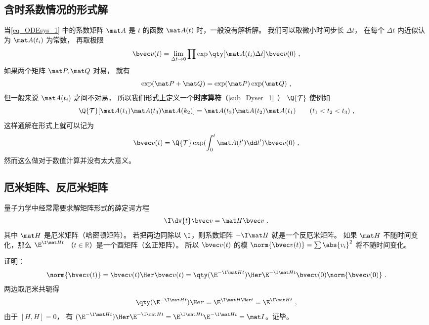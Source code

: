 \subsection{含时系数情况的形式解}
当\autoref{eq_ODEsys_1} 中的系数矩阵 $\mat A$ 是 $t$ 的函数 $\mat A(t)$ 时，一般没有解析解。 我们可以取微小时间步长 $\Delta t$， 在每个 $\Delta t$ 内近似认为 $\mat A(t_i)$ 为常数， 再取极限
\begin{equation}
\bvec v(t) = \lim_{\Delta t \to 0} \prod \exp\qty[\mat A(t_i)\Delta t] \bvec v(0)~,
\end{equation}
如果两个矩阵 $\mat P, \mat Q$ 对易， 就有
\begin{equation}
\exp(\mat P + \mat Q) = \exp(\mat P)\exp(\mat Q)~,
\end{equation}
但一般来说 $\mat A(t_i)$ 之间不对易， 所以我们形式上定义一个\textbf{时序算符}（\autoref{sub_Dyser_1}~） $\Q{\mathcal T}$ 使例如
\begin{equation}
\Q {\mathcal T} [\mat A(t_1) \mat A(t_3) \mat A(k_2)] = \mat A(t_3) \mat A(t_2) \mat A(t_1) \qquad ( t_1 < t_2 < t_3 )~,
\end{equation}
这样通解在形式上就可以记为
\begin{equation}\label{eq_ODEsys_3}
\bvec v(t) = \Q {\mathcal T} \exp(\int_0^ t \mat A(t')\dd t') \bvec v(0)~,
\end{equation}
然而这么做对于数值计算并没有太大意义。

\subsection{厄米矩阵、反厄米矩阵}
量子力学中经常需要求解矩阵形式的薛定谔方程%
\begin{equation}
\I \dv{t} \bvec v = \mat H \bvec v~.
\end{equation}
其中 $\mat H$ 是厄米矩阵（哈密顿矩阵）。 若把两边同除以 $\I$，则系数矩阵 $-\I\mat H$ 就是一个反厄米矩阵。 如果 $\mat H$ 不随时间变化，那么 $\E^{\I \mat H t}$ （$t\in \mathbb R$）是一个酉矩阵（幺正矩阵）。%
所以 $\bvec v(t)$ 的模 $\norm{\bvec v(t)} = \sum \abs{v_i}^2$ 将不随时间变化。

证明：
\begin{equation}
\norm{\bvec v(t)} = \bvec v(t)\Her\bvec v(t) = \qty(\E^{-\I\mat H t})\Her\E^{-\I\mat H t}\bvec v(0)\norm{\bvec v(0)}~.
\end{equation}
两边取厄米共轭得
\begin{equation}
\qty(\E^{-\I \mat H t})\Her = \E^{\I \mat H\Her t} = \E^{\I \mat H t}~,
\end{equation}
由于 $[H,H] = 0$， 有 $(\E^{-\I \mat H t})\Her \E^{-\I \mat H t} = \E^{\I \mat H t}\E^{-\I \mat H t} = \mat I$。证毕。

